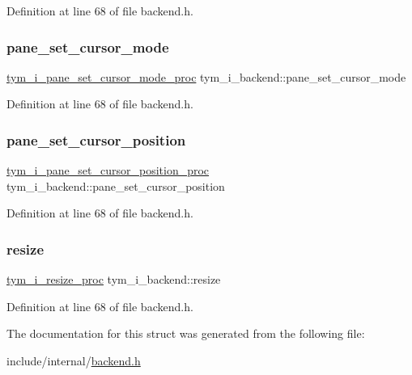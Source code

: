Definition at line 68 of file backend.\+h.

\mbox{\label{structtym__i__backend_abc77f840a378d769e117033440faa961}} 
\subsubsection{\texorpdfstring{pane\+\_\+set\+\_\+cursor\+\_\+mode}{pane\_set\_cursor\_mode}}
{\footnotesize\ttfamily \hyperlink{backend_8h_a9488390b6c0e8e6ee6df0f65c0600033}{tym\+\_\+i\+\_\+pane\+\_\+set\+\_\+cursor\+\_\+mode\+\_\+proc} tym\+\_\+i\+\_\+backend\+::pane\+\_\+set\+\_\+cursor\+\_\+mode}



Definition at line 68 of file backend.\+h.

\mbox{\label{structtym__i__backend_a6422b6a50ad3afbc5732bbef76953ac7}} 
\subsubsection{\texorpdfstring{pane\+\_\+set\+\_\+cursor\+\_\+position}{pane\_set\_cursor\_position}}
{\footnotesize\ttfamily \hyperlink{backend_8h_af5c21e9bc7ce1861a821cf0b8f3baa24}{tym\+\_\+i\+\_\+pane\+\_\+set\+\_\+cursor\+\_\+position\+\_\+proc} tym\+\_\+i\+\_\+backend\+::pane\+\_\+set\+\_\+cursor\+\_\+position}



Definition at line 68 of file backend.\+h.

\mbox{\label{structtym__i__backend_a6a9798091f83b97b02c2765ab9ab7f5b}} 
\subsubsection{\texorpdfstring{resize}{resize}}
{\footnotesize\ttfamily \hyperlink{backend_8h_a969a37c5dad74fed827c63879a3ea594}{tym\+\_\+i\+\_\+resize\+\_\+proc} tym\+\_\+i\+\_\+backend\+::resize}



Definition at line 68 of file backend.\+h.



The documentation for this struct was generated from the following file\+:\begin{DoxyCompactItemize}
\item 
include/internal/\hyperlink{backend_8h}{backend.\+h}\end{DoxyCompactItemize}
